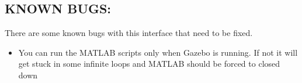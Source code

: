 \documentclass[letterpaper,10pt]{article}
\begin{document}
\subsection{KNOWN BUGS:}\label{known-bugs}

There are some known bugs with this interface that need to be fixed. 
\begin{itemize}
 \item You can run the MATLAB scripts only when Gazebo is running. If not it
will get stuck in some infinite loops and MATLAB should be forced to
closed down 
\end{itemize}
\end{document}
